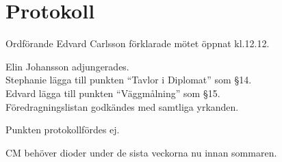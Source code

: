\documentclass[10pt]{article}
\def\mo{Edvard Carlsson}
\begin{document}
\section*{Protokoll}
\begin{paragrafer}
Ordförande {\mo} förklarade mötet öppnat kl.12.12.

{\valavmo}

{\valavms}

{\valavj}

{\tosg}

Elin Johansson adjungerades. \\




Stephanie \ypa lägga till punkten ``Tavlor i Diplomat'' som §14. \\
Edvard \ypa lägga till punkten ``Väggmålning'' som §15. \\
Föredragningslistan godkändes med samtliga yrkanden.




\begin{fyllnadsval} %
\end{fyllnadsval}

\begin{paragrafer}
Punkten protokollfördes ej.

CM behöver dioder under de sista veckorna nu innan sommaren.


\end{paragrafer}
\end{paragrafer}
\end{document}
